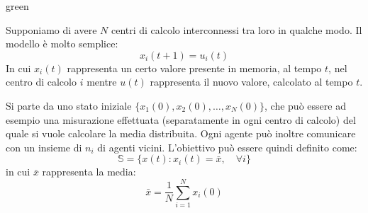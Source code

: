 \begin{mybox}[breakable]{green}{}

Supponiamo di avere $N$ centri di calcolo interconnessi tra loro in qualche modo. Il modello \`e molto semplice: 
\begin{equation}
    x_i(t+1) = u_i(t)
\end{equation}
In cui $x_i(t)$ rappresenta un certo valore presente in memoria, al tempo $t$, nel centro di calcolo $i$ mentre $u(t)$ rappresenta il nuovo valore, calcolato al tempo $t$.

Si parte da uno stato iniziale $\{x_1(0), x_2(0), \dots, x_N(0)\}$, che pu\`o essere ad esempio una misurazione effettuata (separatamente in ogni centro di calcolo) del quale si vuole calcolare la media distribuita. Ogni agente pu\`o inoltre comunicare con un insieme di $n_i$ di agenti vicini. L'obiettivo pu\`o essere quindi definito come:
\begin{equation}
    \mathbb{S} = \{x(t): x_i(t) = \bar{x}, \quad \forall i \}
\end{equation}
in cui $\bar{x}$ rappresenta la media:
\begin{equation}
    \bar{x} = \frac{1}{N} \sum_{i=1}^N x_i(0)
\end{equation}
\end{mybox}